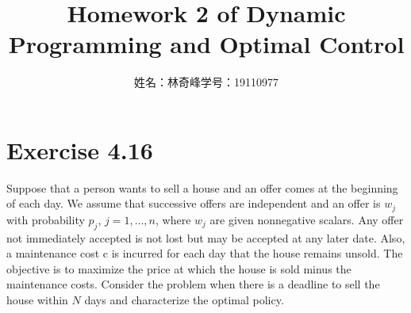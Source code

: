 \documentclass{article}
\begin{document}
    \title{Homework 2 of Dynamic Programming and Optimal Control}
    \author{姓名：林奇峰\qquad 学号：19110977}
    \maketitle

    \section{Exercise 4.16}
    Suppose that a person wants to sell a house and an offer comes at the beginning of each day. We assume that successive offers are independent and an offer is $w_j$ with probability $p_j$, $j=1,\dots,n$, where $w_j$ are given nonnegative scalars. Any offer not immediately accepted is not lost but may be accepted at any later date. Also, a maintenance cost c is incurred for each day that the house remains unsold. The objective is to maximize the price at which the house is sold minus the maintenance costs. Consider the problem when there is a deadline to sell the house within $N$ days and characterize the optimal policy.
\end{document}

